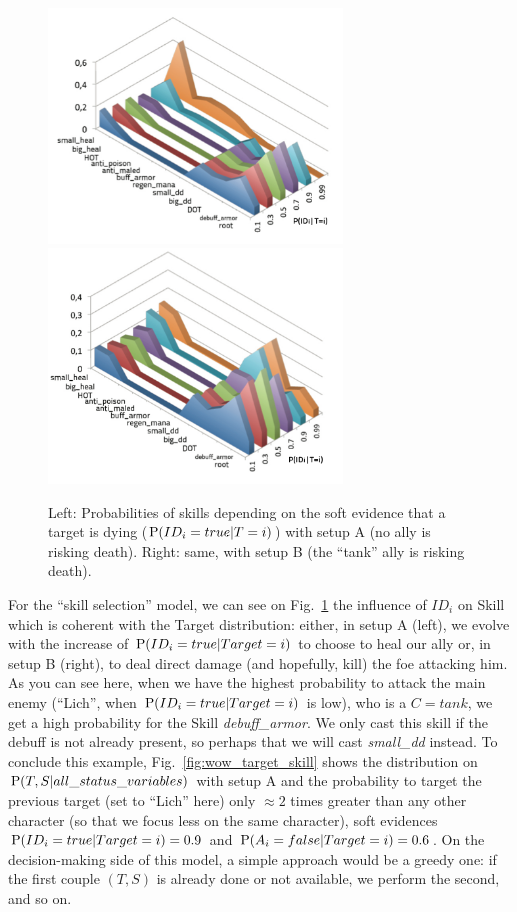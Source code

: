 \begin{figure}[h!]
\begin{center}
\includegraphics[width=7.8cm]{images/wow_distrib_skill1.png} \includegraphics[width=7.8cm]{images/wow_distrib_skill2.png}
\caption{Left: Probabilities of skills depending on the soft evidence that a target is dying ($\mathrm{P}(ID_i=true|T=i)$) with setup A (no ally is risking death). Right: same, with setup B (the ``tank'' ally is risking death).}
\label{fig:wow_skill}
\end{center}
\end{figure}

For the ``skill selection'' model, we can see on Fig.~\ref{fig:wow_skill} the influence of $ID_i$ on Skill which is coherent with the Target distribution: either, in setup A (left), we evolve with the increase of $\mathrm{P}(ID_i=true|Target=i)$ to choose to heal our ally or, in setup B (right), to deal direct damage (and hopefully, kill) the foe attacking him. As you can see here, when we have the highest probability to attack the main enemy (``Lich'', when $\mathrm{P}(ID_i=true|Target=i)$ is low), who is a $C=tank$, we get a high probability for the Skill \textit{debuff\_armor}. We only cast this skill if the debuff is not already present, so perhaps that we will cast \textit{small\_dd} instead. To conclude this example, Fig.~\ref{fig:wow_target_skill} shows the distribution on $\mathrm{P}(T,S|all\_status\_variables)$ with setup A and the probability to target the previous target (set to ``Lich'' here) only $\approx 2$ times greater than any other character (so that we focus less on the same character), soft evidences $\mathrm{P}(ID_i=true|Target=i)=0.9$ and $\mathrm{P}(A_i=false|Target=i)=0.6$. On the decision-making side of this model, a simple approach would be a greedy one: if the first couple $(T,S)$ is already done or not available, we perform the second, and so on.


